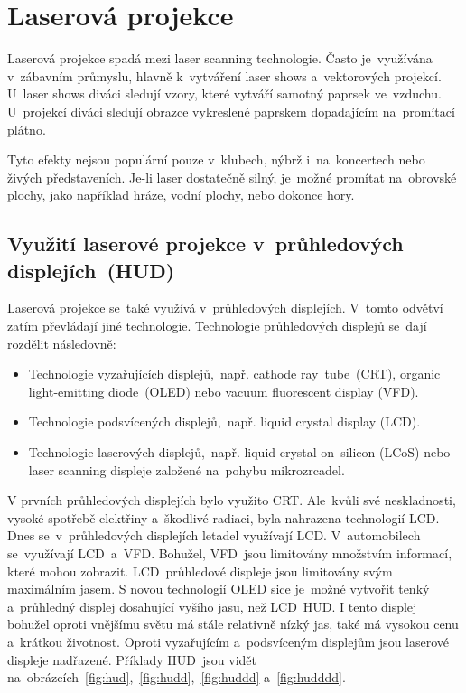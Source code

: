 \chapter{Laserová projekce}
Laserová projekce spadá mezi laser scanning technologie. Často je~využívána v~zábavním průmyslu, hlavně k~vytváření laser shows a~vektorových projekcí. U~laser shows diváci sledují vzory, které vytváří samotný paprsek ve~vzduchu. U~projekcí diváci sledují obrazce vykreslené paprskem dopadajícím na~promítací plátno.~\cite{laser-projection}

Tyto efekty nejsou populární pouze v~klubech, nýbrž i~na~koncertech nebo živých představeních. Je-li laser dostatečně silný, je~možné promítat na~obrovské plochy, jako například hráze, vodní plochy, nebo dokonce hory.~\cite{laser-projection} 

\section{Využití laserové projekce v~průhledových displejích~(HUD)}
Laserová projekce se~také využívá v~průhledových displejích. V~tomto odvětví zatím převládají jiné technologie. Technologie průhledových displejů se~dají rozdělit následovně:

\begin{itemize}
  \item Technologie vyzařujících displejů,~např. cathode ray~tube~(CRT), organic light-emitting diode~(OLED) nebo vacuum fluorescent display (VFD).
  \item Technologie podsvícených displejů,~např. liquid crystal display (LCD).
  \item Technologie laserových displejů,~např. liquid crystal on~silicon (LCoS) nebo laser scanning displeje založené na~pohybu mikrozrcadel.~\cite{dev-of-laser-huds-in-driving}
\end{itemize}

V prvních průhledových displejích bylo využito CRT. Ale~kvůli své neskladnosti, vysoké spotřebě elektřiny a~škodlivé radiaci, byla nahrazena technologií LCD. Dnes se~v~průhledových displejích letadel využívají LCD. V~automobilech se~využívají LCD~a~VFD.
Bohužel, VFD~jsou limitovány množstvím informací, které mohou zobrazit. LCD~průhledové displeje jsou limitovány svým maximálním jasem.
S novou technologií OLED sice je~možné vytvořit tenký a~průhledný displej dosahující vyšího jasu, než LCD~HUD.
I tento displej bohužel oproti vnějšímu světu má stále relativně nízký jas, také má vysokou cenu a~krátkou životnost.
Oproti vyzařujícím a~podsvíceným displejům jsou laserové displeje nadřazené.
Příklady HUD~jsou vidět na~obrázcích~\ref{fig:hud},~\ref{fig:hudd},~\ref{fig:huddd} a~\ref{fig:hudddd}.~\cite{dev-of-laser-huds-in-driving}

